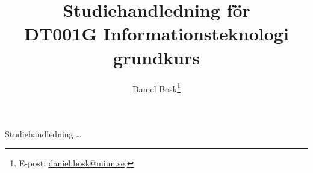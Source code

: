 \documentclass[a4paper,11pt,logo]{miunart}
\title{Studiehandledning för\\DT001G Informationsteknologi grundkurs}
\author{Daniel Bosk\footnote{%
	E-post: \href{mailto:daniel.bosk@miun.se}{daniel.bosk@miun.se}.
}}
\date{\svnId}
\begin{document}
\maketitle
\noindent
Studiehandledning \dots



\end{document}
